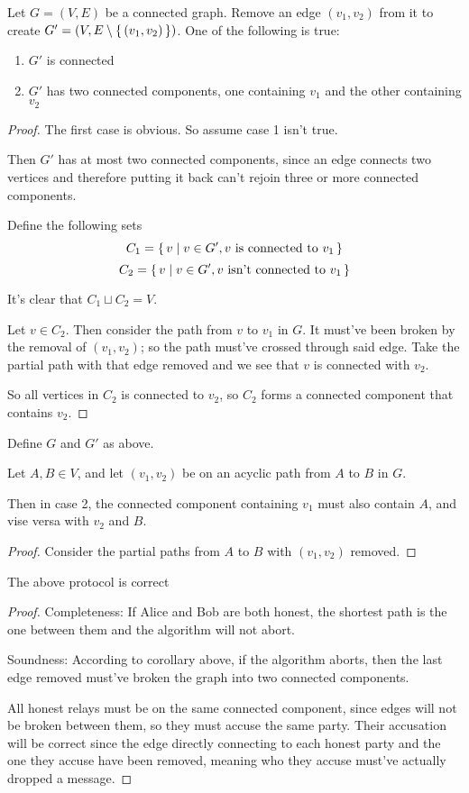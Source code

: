 \documentclass{article}
\begin{document}
\begin{thm}
	Let $G=(V,E)$ be a connected graph. Remove an edge $(v_1, v_2)$ from it to create $G'=(V,E\setminus\set{(v_1, v_2)})$. One of the following is true:
	\begin{enumerate}
	\item $G'$ is connected
	\item $G'$ has two connected components, one containing $v_1$ and the other containing $v_2$
	\end{enumerate}
\end{thm}
\begin{proof}
The first case is obvious. So assume case 1 isn't true.

Then $G'$ has at most two connected components, since an edge connects two vertices and therefore putting it back can't rejoin three or more connected components.

Define the following sets
$$C_1=\set{v|v\in G', v \textnormal{ is connected to } v_1}$$
$$C_2=\set{v|v\in G', v \textnormal{ isn't connected to } v_1}$$

It's clear that $C_1\sqcup C_2=V$.

Let $v\in C_2$. Then consider the path from $v$ to $v_1$ in $G$. It must've been broken by the removal of $(v_1, v_2)$; so the path must've crossed through said edge.
Take the partial path with that edge removed and we see that $v$ is connected with $v_2$.

So all vertices in $C_2$ is connected to $v_2$, so $C_2$ forms a connected component that contains $v_2$.
\end{proof}
\begin{cor}
Define $G$ and $G'$ as above.

Let $A, B\in V$, and let $(v_1, v_2)$ be on an acyclic path from $A$ to $B$ in $G$.

Then in case 2, the connected component containing $v_1$ must also contain $A$, and vise versa with $v_2$ and $B$.
\end{cor}
\begin{proof}
Consider the partial paths from $A$ to $B$ with $(v_1, v_2)$ removed.
\end{proof}

\begin{thm}
The above protocol is correct
\end{thm}

\begin{proof}
Completeness: If Alice and Bob are both honest, the shortest path is the one between them and the algorithm will not abort.

Soundness:
According to corollary above, if the algorithm aborts, then the last edge removed must've broken the graph into two connected components.

All honest relays must be on the same connected component, since edges will not be broken between them, so they must accuse the same party.
Their accusation will be correct since the edge directly connecting to each honest party and the one they accuse have been removed, meaning who they accuse must've actually dropped a message.
\end{proof}
\end{document}
